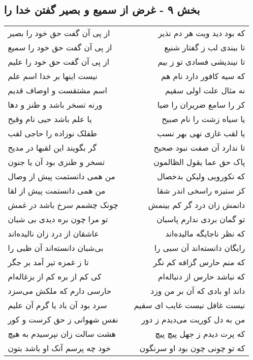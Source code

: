 \begin{center}
\section*{بخش ۹ - غرض از سمیع و بصیر گفتن خدا را}
\label{sec:sh009}
\begin{longtable}{l p{0.5cm} r}
از پی آن گفت حق خود را بصیر
&&
که بود دید ویت هر دم نذیر
\\
از پی آن گفت حق خود را سمیع
&&
تا ببندی لب ز گفتار شنیع
\\
از پی آن گفت حق خود را علیم
&&
تا نیندیشی فسادی تو ز بیم
\\
نیست اینها بر خدا اسم علم
&&
که سیه کافور دارد نام هم
\\
اسم مشتقست و اوصاف قدیم
&&
نه مثال علت اولی سقیم
\\
ورنه تسخر باشد و طنز و دها
&&
کر را سامع ضریران را ضیا
\\
یا علم باشد حیی نام وقیح
&&
یا سیاه زشت را نام صبیح
\\
طفلک نوزاده را حاجی لقب
&&
یا لقب غازی نهی بهر نسب
\\
گر بگویند این لقبها در مدیح
&&
تا ندارد آن صفت نبود صحیح
\\
تسخر و طنزی بود آن یا جنون
&&
پاک حق عما یقول الظالمون
\\
من همی دانستمت پیش از وصال
&&
که نکورویی ولیکن بدخصال
\\
من همی دانستمت پیش از لقا
&&
کز ستیزه راسخی اندر شقا
\\
چونک چشمم سرخ باشد در غمش
&&
دانمش زان درد گر کم بینمش
\\
تو مرا چون بره دیدی بی شبان
&&
تو گمان بردی ندارم پاسبان
\\
عاشقان از درد زان نالیده‌اند
&&
که نظر ناجایگه مالیده‌اند
\\
بی‌شبان دانسته‌اند آن ظبی را
&&
رایگان دانسته‌اند آن سبی را
\\
تا ز غمزه تیر آمد بر جگر
&&
که منم حارس گزافه کم نگر
\\
کی کم از بره کم از بزغاله‌ام
&&
که نباشد حارس از دنباله‌ام
\\
حارسی دارم که ملکش می‌سزد
&&
داند او بادی که آن بر من وزد
\\
سرد بود آن باد یا گرم آن علیم
&&
نیست غافل نیست غایب ای سقیم
\\
نفس شهوانی ز حق کرست و کور
&&
من به دل کوریت می‌دیدم ز دور
\\
هشت سالت زان نپرسیدم به هیچ
&&
که پرت دیدم ز جهل پیچ پیچ
\\
خود چه پرسم آنک او باشد بتون
&&
که تو چونی چون بود او سرنگون
\\
\end{longtable}
\end{center}
